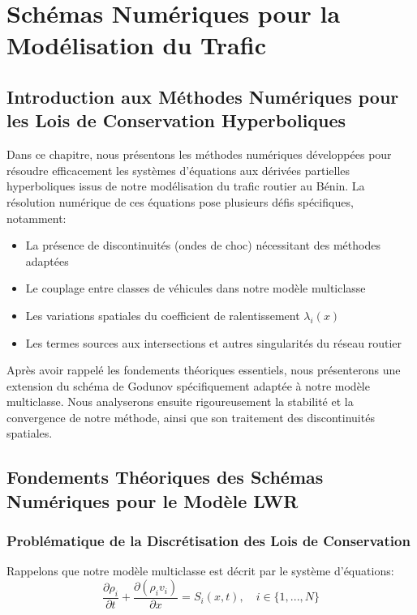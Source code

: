 \chapter{Schémas Numériques pour la Modélisation du Trafic}
\label{chap:schemas_numeriques}

\section{Introduction aux Méthodes Numériques pour les Lois de Conservation Hyperboliques}
\label{sec:intro_methodes_numeriques}

Dans ce chapitre, nous présentons les méthodes numériques développées pour résoudre efficacement les systèmes d'équations aux dérivées partielles hyperboliques issus de notre modélisation du trafic routier au Bénin. La résolution numérique de ces équations pose plusieurs défis spécifiques, notamment:
\begin{itemize}
    \item La présence de discontinuités (ondes de choc) nécessitant des méthodes adaptées
    \item Le couplage entre classes de véhicules dans notre modèle multiclasse
    \item Les variations spatiales du coefficient de ralentissement $\lambda_i(x)$
    \item Les termes sources aux intersections et autres singularités du réseau routier
\end{itemize}

Après avoir rappelé les fondements théoriques essentiels, nous présenterons une extension du schéma de Godunov spécifiquement adaptée à notre modèle multiclasse. Nous analyserons ensuite rigoureusement la stabilité et la convergence de notre méthode, ainsi que son traitement des discontinuités spatiales.

\section{Fondements Théoriques des Schémas Numériques pour le Modèle LWR}
\label{sec:fondements_schemas}

\subsection{Problématique de la Discrétisation des Lois de Conservation}
\label{subsec:problematique_discretisation}

Rappelons que notre modèle multiclasse est décrit par le système d'équations:
\begin{equation}
\frac{\partial \rho_i}{\partial t} + \frac{\partial(\rho_i v_i)}{\partial x} = S_i(x,t), \quad i \in \{1,...,N\}
\end{equation}

